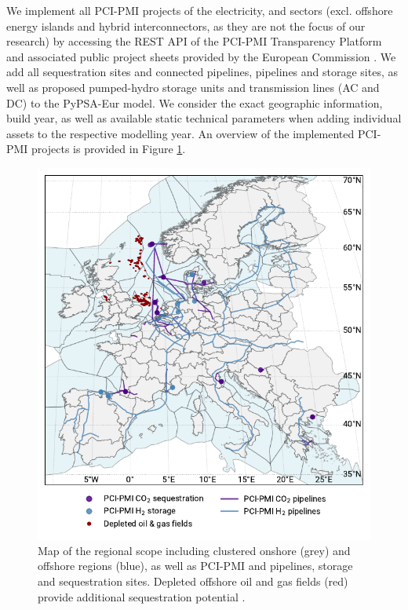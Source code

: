 \documentclass[preprint,12pt,sort&compress]{elsarticle}
\begin{document}
We implement all PCI-PMI projects of the electricity,  and  sectors (excl. offshore energy islands and hybrid interconnectors, as they are not the focus of our research) by accessing the REST API of the PCI-PMI Transparency Platform and associated public project sheets provided by the European Commission \cite{europeancommissionPCIPMITransparencyPlatform2024}. We add all  sequestration sites and connected pipelines,  pipelines and storage sites, as well as proposed pumped-hydro storage units and transmission lines (AC and DC) to the PyPSA-Eur model. We consider the exact geographic information, build year, as well as available static technical parameters when adding individual assets to the respective modelling year. An overview of the implemented PCI-PMI projects is provided in Figure \ref{fig:regional_scope_map}.
\begin{figure}[htbp]
  \centering
  \includegraphics[width=0.8\linewidth]{map_adm_pcipmi}
  \caption{Map of the regional scope including clustered onshore (grey) and offshore regions (blue), as well as PCI-PMI  and  pipelines, storage and sequestration sites. Depleted offshore oil and gas fields (red) provide additional  sequestration potential \cite{hofmannH2CO2Network2025}.}
  \label{fig:regional_scope_map}
\end{figure}
\end{document}
